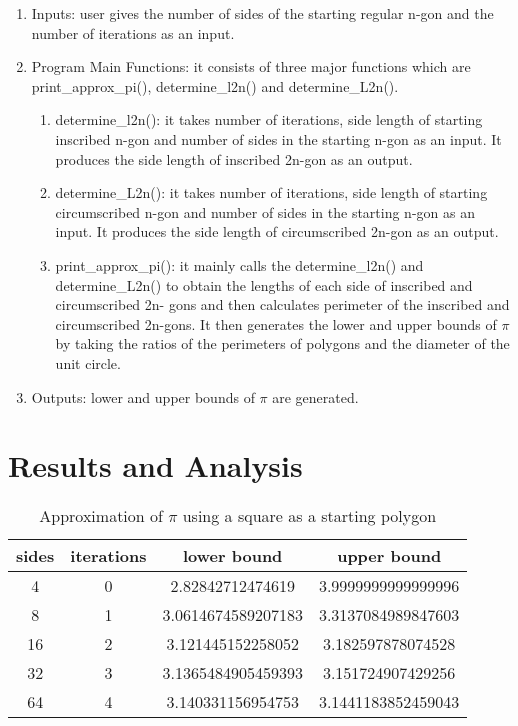 \documentclass[12pt]{article}
\begin{document}
\begin{enumerate}
\item Inputs: user gives the number of sides of the starting regular n-gon and
the number of iterations as an input.
\item Program Main Functions: it consists of three major functions which are
print\_approx\_pi(), determine\_l2n() and determine\_L2n().
\begin{enumerate}
\item determine\_l2n(): it takes number of iterations, side length of starting
inscribed n-gon and number of sides in the starting n-gon as an input. It produces
the side length of inscribed 2n-gon as an output.
\item determine\_L2n(): it takes number of iterations, side length of starting
circumscribed n-gon and number of sides in the starting n-gon as an input. It produces the
side length of circumscribed 2n-gon as an output.
\item print\_approx\_pi(): it mainly calls the determine\_l2n() and determine\_L2n()
to obtain the lengths of each side of inscribed and circumscribed 2n-
gons and then calculates perimeter of the inscribed and circumscribed 2n-gons. It then generates the lower and upper bounds of $\pi$ by taking the ratios of the perimeters of polygons and the diameter of the unit circle.
\end{enumerate}
\item Outputs: lower and upper bounds of $\pi$ are generated.
\end{enumerate}


\section {Results and Analysis}

\begin{table}[h!]
  \begin{center}
    \caption{Approximation of $\pi$ using a square as a starting polygon}
    \bigskip
    \label{tab:table1}
    \begin{tabular}{c|c|c|c}
      \textbf{sides} & \textbf{iterations} & \textbf{lower bound} & \textbf{upper bound}\\ %
      \hline
      4 & 0 & 2.82842712474619 & 3.9999999999999996\\ %
      8 & 1 & 3.0614674589207183 & 3.3137084989847603\\ %
      16 & 2 & 3.121445152258052 & 3.182597878074528\\ %
      32 & 3 & 3.1365484905459393 & 3.151724907429256\\ %
      64 & 4 & 3.140331156954753 & 3.1441183852459043\\ %
    \end{tabular}
  \end{center}
\end{table}
\end{document}
